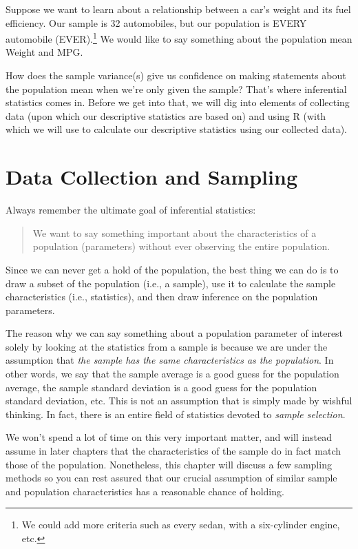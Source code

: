 \documentclass[
]{book}
\begin{document}
Suppose we want to learn about a relationship between a car's weight and its fuel efficiency. Our sample is 32 automobiles, but our population is EVERY automobile (EVER).\footnote{We could add more criteria such as every sedan, with a six-cylinder engine, etc.} We would like to say something about the population mean Weight and MPG.

How does the sample variance(s) give us confidence on making statements about the population mean when we're only given the sample? That's where inferential statistics comes in. Before we get into that, we will dig into elements of collecting data (upon which our descriptive statistics are based on) and using R (with which we will use to calculate our descriptive statistics using our collected data).

\hypertarget{Data}{%
\chapter{Data Collection and Sampling}\label{Data}}

Always remember the ultimate goal of inferential statistics:

\begin{quote}
We want to say something important about the characteristics of a population (parameters) without ever observing the entire population.
\end{quote}

Since we can never get a hold of the population, the best thing we can do is to draw a subset of the population (i.e., a sample), use it to calculate the sample characteristics (i.e., statistics), and then draw inference on the population parameters.

The reason why we can say something about a population parameter of interest solely by looking at the statistics from a sample is because we are under the assumption that \emph{the sample has the same characteristics as the population}. In other words, we say that the sample average is a good guess for the population average, the sample standard deviation is a good guess for the population standard deviation, etc. This is not an assumption that is simply made by wishful thinking. In fact, there is an entire field of statistics devoted to \emph{sample selection}.

We won't spend a lot of time on this very important matter, and will instead assume in later chapters that the characteristics of the sample do in fact match those of the population. Nonetheless, this chapter will discuss a few sampling methods so you can rest assured that our crucial assumption of similar sample and population characteristics has a reasonable chance of holding.
\end{document}

